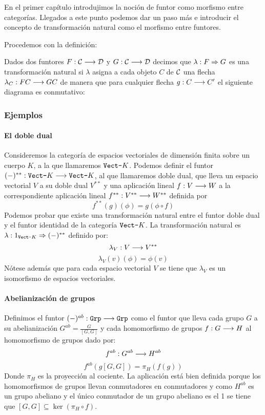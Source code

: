 En el primer capítulo introdujimos la noción de funtor
como morfismo
entre categorías. Llegados a este punto
podemos dar un paso más
e introducir el concepto de transformación
natural como el morfismo
entre funtores.

Procedemos con la definición:

\begin{definition}
  Dados dos funtores $F: \mathcal{C}\longrightarrow \mathcal{D}$ y $G : \mathcal{C}\longrightarrow \mathcal{D}$ decimos
  que $\lambda : F\Rightarrow G$ es una transformación natural si $\lambda$
  asigna a cada objeto $C$ de $\mathcal{C}$ una flecha
  $\lambda_C : FC\longrightarrow GC$ de manera que para
  cualquier flecha $g : C\longrightarrow C'$ el siguiente diagrama
  es conmutativo:
\begin{center}
  \end{center}
\end{definition}

\subsubsection{Ejemplos}
\paragraph{El doble dual}
Consideremos la categoría de espacios vectoriales de dimensión
finita sobre un cuerpo $K$, a la que llamaremos $\texttt{Vect-}K$. Podemos
definir el funtor $(-)^{**}: \texttt{Vect-}K\longrightarrow \texttt{Vect-}K$, al que llamaremos
doble dual, que lleva un espacio vectorial $V$ a su doble dual
$V^{**}$ y una aplicación lineal
$f: V\longrightarrow W$ a la correspondiente aplicación
lineal
$f^{**} : V^{**}\longrightarrow W^{**}$ definida por
$$f^{**}(g)(\phi) = g(\phi\circ f)$$
Podemos probar que existe una transformación
natural entre el funtor doble dual y el funtor identidad
de la categoría $\texttt{Vect-}K$. La transformación
natural es $\lambda : 1_{\texttt{Vect-}K}\Rightarrow (-)^{**}$ definido por:
$$\lambda_V : V\longrightarrow V^{**}$$
$$\lambda_V(v)(\phi) = \phi(v)$$
Nótese además que para cada espacio vectorial $V$ se tiene
que $\lambda_V$ es un isomorfismo de espacios vectoriales.

\paragraph{Abelianización de grupos}
Definimos el funtor $(-)^{ab} : \texttt{Grp}\longrightarrow \texttt{Grp}$
como el funtor que lleva
cada grupo $G$ a su abelianización
$G^{ab} =\frac{G}{[G, G]}$
y cada homomorfismo de grupos $f : G\longrightarrow H$ al homomorfismo
de grupos dado por:
$$f^{ab} : G^{ab}\longrightarrow H^{ab}$$
$$f^{ab}(g[G, G]) = \pi_H (f(g))$$
Donde $\pi_H$ es la proyección al cociente.
La aplicación está bien definida porque los homomorfismos
de grupos llevan conmutadores en conmutadores y como
$H^{ab}$ es un grupo abeliano y el único conmutador de un
grupo abeliano es el 1 se tiene que
$[G, G] \subseteq \ker (\pi_H \circ f)$.

